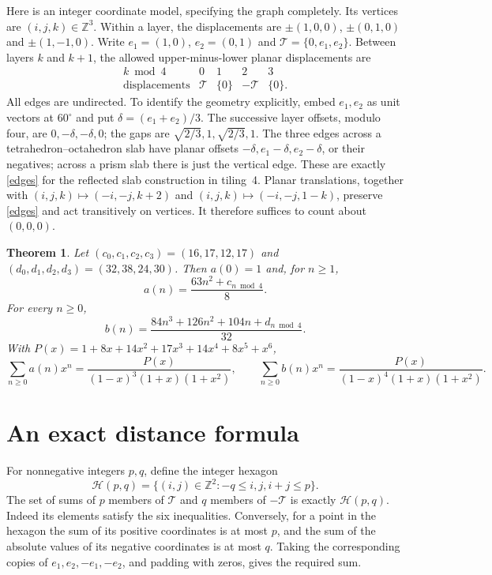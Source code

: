 \documentclass[11pt]{article}
\newtheorem{theorem}{Theorem}
\newcommand{\Z}{\mathbb Z}
\newcommand{\T}{\mathcal T}
\newcommand{\Hh}{\mathcal H}
\begin{document}
Here is an integer coordinate model, specifying the graph completely.
Its vertices are $(i,j,k)\in\Z^3$. Within a layer, the displacements are
$\pm(1,0,0)$, $\pm(0,1,0)$ and $\pm(1,-1,0)$.
Write $e_1=(1,0)$, $e_2=(0,1)$ and $\T=\{0,e_1,e_2\}$.
Between layers $k$ and $k+1$, the allowed upper-minus-lower planar
displacements are
\begin{equation}\label{edges}
\begin{array}{c|cccc}
k\bmod4&0&1&2&3\\\hline
\text{displacements}&\T&\{0\}&-\T&\{0\}.
\end{array}
\end{equation}
All edges are undirected. To identify the geometry explicitly, embed $e_1,e_2$
as unit vectors at $60^\circ$ and put $\delta=(e_1+e_2)/3$.
The successive layer offsets, modulo four, are $0,-\delta,-\delta,0$;
the gaps are $\sqrt{2/3},1,\sqrt{2/3},1$.
The three edges across a tetrahedron--octahedron slab have planar offsets
$-\delta,e_1-\delta,e_2-\delta$, or their negatives; across a prism slab
there is just the vertical edge. These are exactly \eqref{edges} for the
reflected slab construction in tiling~4.
Planar translations, together with
$(i,j,k)\mapsto(-i,-j,k+2)$ and
$(i,j,k)\mapsto(-i,-j,1-k)$, preserve \eqref{edges} and act transitively
on vertices. It therefore suffices to count about $(0,0,0)$.

\begin{theorem}\label{main}
Let $(c_0,c_1,c_2,c_3)=(16,17,12,17)$ and
$(d_0,d_1,d_2,d_3)=(32,38,24,30)$. Then $a(0)=1$ and, for $n\ge1$,
\begin{equation}\label{shellformula}
a(n)=\frac{63n^2+c_{n\bmod4}}8.
\end{equation}
For every $n\ge0$,
\begin{equation}\label{ballformula}
b(n)=\frac{84n^3+126n^2+104n+d_{n\bmod4}}{32}.
\end{equation}
With $P(x)=1+8x+14x^2+17x^3+14x^4+8x^5+x^6$,
\begin{equation}\label{gf}
\sum_{n\ge0}a(n)x^n=\frac{P(x)}{(1-x)^3(1+x)(1+x^2)},\qquad
\sum_{n\ge0}b(n)x^n=\frac{P(x)}{(1-x)^4(1+x)(1+x^2)}.
\end{equation}
\end{theorem}

\section{An exact distance formula}
For nonnegative integers $p,q$, define the integer hexagon
\[
\Hh(p,q)=\{(i,j)\in\Z^2:-q\le i,j,i+j\le p\}.
\]
The set of sums of $p$ members of $\T$ and $q$ members of $-\T$ is
exactly $\Hh(p,q)$. Indeed its elements satisfy the six inequalities.
Conversely, for a point in the hexagon the sum of its positive coordinates
is at most $p$, and the sum of the absolute values of its negative
coordinates is at most $q$. Taking the corresponding copies of
$e_1,e_2,-e_1,-e_2$, and padding with zeros, gives the required sum.
\end{document}
